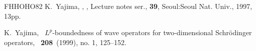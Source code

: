 \documentclass[reqno]{amsart}
\numberwithin{equation}{section}
\begin{document}
\begin{thebibliography}{FHHOHO82}
K.~Yajima,
,
, Lecture notes ser., {\bf39}, Seoul:Seoul Nat. Univ., 1997, 13pp.

K.~Yajima,
~{$L^p$}-boundedness of wave operators for two-dimensional
  {S}chr\"{o}dinger operators,
~{\bf208}~(1999), no. 1, 125--152.

\end{thebibliography}
\end{document}
